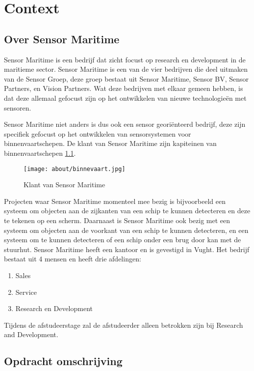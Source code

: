 \chapter{Context}
\section{Over Sensor Maritime}
Sensor Maritime is een bedrijf dat zicht focust op research en development in de maritieme sector. Sensor Maritime is een van de vier bedrijven die deel uitmaken van de Sensor Groep, deze groep bestaat uit Sensor Maritime, Sensor BV, Sensor Partners, en Vision Partners. Wat deze bedrijven met elkaar gemeen hebben, is dat deze allemaal gefocust zijn op het ontwikkelen van nieuwe technologieën met sensoren. \newline

\noindent Sensor Maritime niet anders is dus ook een sensor georiënteerd bedrijf, deze zijn specifiek gefocust op het ontwikkelen van sensorsystemen voor binnenvaartschepen. De klant van Sensor Maritime zijn kapiteinen van binnenvaartschepen \ref{fig:customer_sensor_maritime}.
\begin{figure}[h!]
	\label{fig:customer_sensor_maritime}
	\texttt{[image: about/binnevaart.jpg]}
	\caption{Klant van Sensor Maritime}

\end{figure}
\newpage
\noindent Projecten waar Sensor Maritime momenteel mee bezig is bijvoorbeeld een systeem om objecten aan de zijkanten van een schip te kunnen detecteren en deze te tekenen op een scherm. Daarnaast is Sensor Maritime ook bezig met een systeem om objecten aan de voorkant van een schip te kunnen detecteren, en een systeem om te kunnen detecteren of een schip onder een brug door kan met de stuurhut. Sensor Maritime heeft een kantoor en is gevestigd in Vught. Het bedrijf bestaat uit 4 mensen en heeft drie afdelingen:
\begin{enumerate}
	\item Sales
	\item Service
	\item Research en Development
\end{enumerate}
Tijdens de afstudeerstage zal de afstudeerder alleen betrokken zijn bij Research and Development.

\section{Opdracht omschrijving}